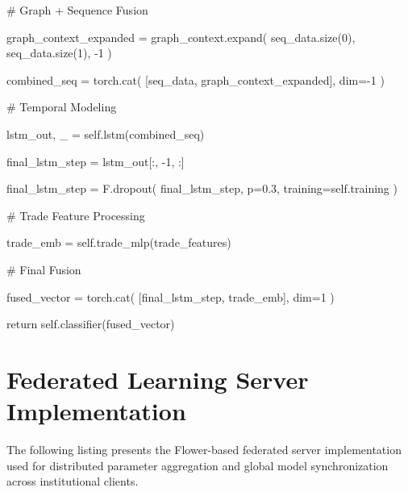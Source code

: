 \begin{tcblisting}
        # Graph + Sequence Fusion

        graph_context_expanded = graph_context.expand(
            seq_data.size(0),
            seq_data.size(1),
            -1
        )

        combined_seq = torch.cat(
            [seq_data, graph_context_expanded],
            dim=-1
        )

        # Temporal Modeling

        lstm_out, _ = self.lstm(combined_seq)

        final_lstm_step = lstm_out[:, -1, :]

        final_lstm_step = F.dropout(
            final_lstm_step,
            p=0.3,
            training=self.training
        )

        # Trade Feature Processing

        trade_emb = self.trade_mlp(trade_features)

        # Final Fusion

        fused_vector = torch.cat(
            [final_lstm_step, trade_emb],
            dim=1
        )

        return self.classifier(fused_vector)

\end{tcblisting}


\section{Federated Learning Server Implementation}

The following listing presents the Flower-based federated server implementation used for distributed parameter aggregation and global model synchronization across institutional clients.

